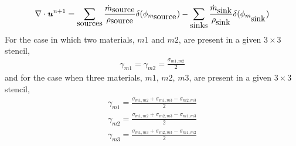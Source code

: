 \documentclass[]{article}
\newcommand{\bmu}{\mbox{\boldmath $u$\unboldmath}}
\begin{document}
\begin{itemize}
\begin{eqnarray*}
  \nabla \cdot \bmu^{n+1} = 
   \sum_{\mbox{sources}} 
   \frac{\dot{m}_{\mbox{source}}}
        {\rho_{\mbox{source}}}\delta(\phi_{m_{\mbox{source}}}) -
   \sum_{\mbox{sinks}} 
   \frac{\dot{m}_{\mbox{sink}}}
        {\rho_{\mbox{sink}}}\delta(\phi_{m_{\mbox{sink}}}) 
  \end{eqnarray*}
  For the case in which two materials, $m1$ and $m2$,
  are present in a given $3\times 3$
  stencil,
  \begin{eqnarray*}
  \gamma_{m1}=\gamma_{m2}=\frac{\sigma_{m1,m2}}{2} 
  \end{eqnarray*}
  and for the case when three materials, $m1$, $m2$, $m3$, are
  present in a given $3\times 3$ stencil,
  \begin{eqnarray*}
  \gamma_{m1}=\frac{\sigma_{m1,m2}+\sigma_{m1,m3}-\sigma_{m2,m3}}{2} 
  \end{eqnarray*}
  \begin{eqnarray*}
  \gamma_{m2}=\frac{\sigma_{m1,m2}+\sigma_{m2,m3}-\sigma_{m1,m3}}{2} 
  \end{eqnarray*}
  \begin{eqnarray*}
  \gamma_{m3}=\frac{\sigma_{m1,m3}+\sigma_{m2,m3}-\sigma_{m1,m2}}{2} 
  \end{eqnarray*}

\end{itemize}
\end{document}
